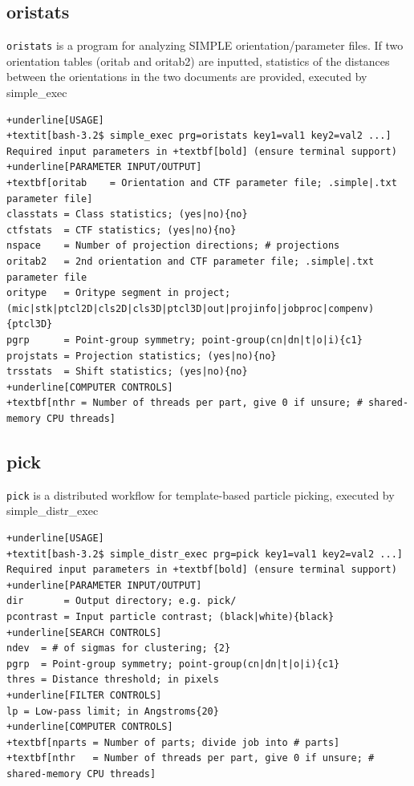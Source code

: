 \documentclass[a4paper,11pt]{article}
\newcommand{\prgname}[1]{\textcolor{NavyBlue}{\texttt{#1}}}
\begin{document}
\subsection{oristats}
\label{oristats}
\prgname{oristats} is a program for analyzing SIMPLE orientation/parameter files. If two orientation tables (oritab and oritab2) are inputted, statistics of the distances between the orientations in the two documents are provided, executed by simple\_exec
\begin{Verbatim}[commandchars=+\[\],fontsize=\small,breaklines=true]
+underline[USAGE]
+textit[bash-3.2$ simple_exec prg=oristats key1=val1 key2=val2 ...]
Required input parameters in +textbf[bold] (ensure terminal support)
+underline[PARAMETER INPUT/OUTPUT]
+textbf[oritab    = Orientation and CTF parameter file; .simple|.txt parameter file]
classtats = Class statistics; (yes|no){no}
ctfstats  = CTF statistics; (yes|no){no}
nspace    = Number of projection directions; # projections
oritab2   = 2nd orientation and CTF parameter file; .simple|.txt parameter file
oritype   = Oritype segment in project; (mic|stk|ptcl2D|cls2D|cls3D|ptcl3D|out|projinfo|jobproc|compenv){ptcl3D}
pgrp      = Point-group symmetry; point-group(cn|dn|t|o|i){c1}
projstats = Projection statistics; (yes|no){no}
trsstats  = Shift statistics; (yes|no){no}
+underline[COMPUTER CONTROLS]
+textbf[nthr = Number of threads per part, give 0 if unsure; # shared-memory CPU threads]
\end{Verbatim}

\subsection{pick}
\label{pick}
\prgname{pick} is a distributed workflow for template-based particle picking, executed by simple\_distr\_exec
\begin{Verbatim}[commandchars=+\[\],fontsize=\small,breaklines=true]
+underline[USAGE]
+textit[bash-3.2$ simple_distr_exec prg=pick key1=val1 key2=val2 ...]
Required input parameters in +textbf[bold] (ensure terminal support)
+underline[PARAMETER INPUT/OUTPUT]
dir       = Output directory; e.g. pick/
pcontrast = Input particle contrast; (black|white){black}
+underline[SEARCH CONTROLS]
ndev  = # of sigmas for clustering; {2}
pgrp  = Point-group symmetry; point-group(cn|dn|t|o|i){c1}
thres = Distance threshold; in pixels
+underline[FILTER CONTROLS]
lp = Low-pass limit; in Angstroms{20}
+underline[COMPUTER CONTROLS]
+textbf[nparts = Number of parts; divide job into # parts]
+textbf[nthr   = Number of threads per part, give 0 if unsure; # shared-memory CPU threads]
\end{Verbatim}
\end{document}
